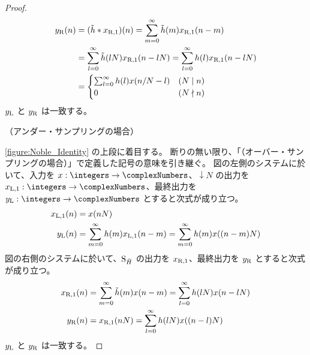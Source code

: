 \begin{proof}
\begin{align*}
                y_{\mathrm{R}}(n) &= (\tilde{h}*x_{\mathrm{R},1})(n) = \sum_{m=0}^\infty \tilde{h}(m)x_{\mathrm{R},1}(n-m) \\
                &= \sum_{l=0}^\infty \tilde{h}(lN)x_{\mathrm{R},1}(n-lN) = \sum_{l=0}^\infty h(l)x_{\mathrm{R},1}(n-lN) \\
                &= \begin{cases}
                    \sum_{l=0}^\infty h(l)x(n/N-l) & (N\mid n) \\
                    0 & (N\nmid n)
                \end{cases}
            \end{align*}
            $y_{\mathrm{L}}$ と $y_{\mathrm{R}}$ は一致する。
            \newline
            \quad\par\noindent
            （アンダー・サンプリングの場合）
            \par\noindent
            \cref{figure:Noble_Identity} の上段に着目する。
            断りの無い限り、「（オーバー・サンプリングの場合）」で定義した記号の意味を引き継ぐ。
            図の左側のシステムに於いて、入力を $x:\integers\to\complexNumbers$、$\downarrow N$ の出力を $\xLone:\integers\to\complexNumbers$、最終出力を $\yL:\integers\to\complexNumbers$ とすると次式が成り立つ。
            \begin{align*}
                x_{\mathrm{L},1}(n) &= x(nN) \\
                y_{\mathrm{L}}(n) &= \sum_{m=0}^\infty h(m)x_{\mathrm{L},1}(n-m) = \sum_{m=0}^\infty h(m)x((n-m)N)
            \end{align*}
            図の右側のシステムに於いて、$\mathrm{S}_{\tilde{H}}$ の出力を $x_{\mathrm{R},1}$、最終出力を $y_{\mathrm{R}}$ とすると次式が成り立つ。
            \begin{align*}
                x_{\mathrm{R},1}(n) &= \sum_{m=0}^\infty \tilde{h}(m)x(n-m) = \sum_{l=0}^\infty h(lN)x(n-lN) \\
                y_{\mathrm{R}}(n) &= x_{\mathrm{R},1}(nN) = \sum_{l=0}^\infty h(lN)x((n-l)N)
            \end{align*}
            $y_{\mathrm{L}}$ と $y_{\mathrm{R}}$ は一致する。
        \end{proof}
